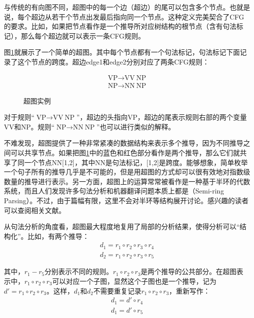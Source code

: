 \parinterval 与传统的有向图不同，超图中的每一个边（超边）的尾可以包含多个节点。也就是说，每个超边从若干个节点出发最后指向同一个节点。这种定义完美契合了CFG的要求。比如，如果把节点看作是一个推导所对应树结构的根节点（含有句法标记），那么每个超边就可以表示一条CFG规则。

\parinterval 图\ref{fig:8-37}就展示了一个简单的超图。其中每个节点都有一个句法标记，句法标记下面记录了这个节点的跨度。超边edge1和edge2分别对应了两条CFG规则：

\begin{eqnarray}
\textrm{VP} \rightarrow \textrm{VV}\ \textrm{NP} \nonumber \\
\textrm{NP} \rightarrow \textrm{NN}\ \textrm{NP} \nonumber
\end{eqnarray}

\begin{figure}[htp]
\centering

\caption{超图实例}
\label{fig:8-37}
\end{figure}

\parinterval 对于规则“$\textrm{VP} \rightarrow \textrm{VV}\ \textrm{NP}$”，超边的头指向VP，超边的尾表示规则右部的两个变量VV和NP。规则“$\textrm{NP} \rightarrow \textrm{NN}\ \textrm{NP}$”也可以进行类似的解释。

\parinterval 不难发现，超图提供了一种非常紧凑的数据结构来表示多个推导，因为不同推导之间可以共享节点。如果把图\ref{fig:8-37}中的蓝色和红色部分看作是两个推导，那么它们就共享了同一个节点NN[1,2]，其中NN是句法标记，[1,2]是跨度。能够想象，简单枚举一个句子所有的推导几乎是不可能的，但是用超图的方式却可以很有效地对指数级数量的推导进行表示。另一方面，超图上的运算常常被看作是一种基于半环的代数系统，而且人们发现许多句法分析和机器翻译问题本质上都是{\small{}}（Semi-ring Parsing）。不过，由于篇幅有限，这里不会对半环等结构展开讨论。感兴趣的读者可以查阅相关文献。

\parinterval 从句法分析的角度看，超图最大程度地复用了局部的分析结果，使得分析可以“结构化”。比如，有两个推导：
\begin{eqnarray}
d_1 = {r_1} \circ {r_2} \circ {r_3} \circ {r_4} \label{eqa4.30}\\
d_2 = {r_1} \circ {r_2} \circ {r_3} \circ {r_5}
\label{eq:8-10}
\end{eqnarray}

\noindent 其中，$r_1 - r_5$分别表示不同的规则。${r_1} \circ {r_2} \circ {r_3}$是两个推导的公共部分。在超图表示中，${r_1} \circ {r_2} \circ {r_3}$可以对应一个子图，显然这个子图也是一个推导，记为${d'}= {r_1} \circ {r_2} \circ {r_3}$。这样，$d_1$和$d_2$不需要重复记录${r_1} \circ {r_2} \circ {r_3}$，重新写作：
\begin{eqnarray}
d_1 = {d'} \circ {r_4} \label{eqa4.32}\\
d_1 = {d'} \circ {r_5}
\label{eq:8-12}
\end{eqnarray}

